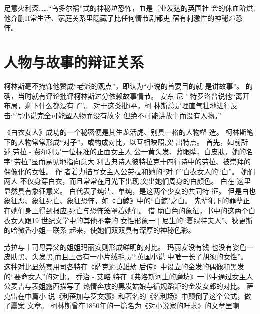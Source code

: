\documentclass[a4paper]{article}
\begin{document}
足意火利深……“乌多尔祸”式的神秘垃恐怖，血是〔业发达的英国社
会的休血阶烘;他介删H常生活、家庭关系里隐藏了比任何情节剧都吏
宿有刺激性的神秘煊恐怖。

\section{人物与故事的辩证关系}

柯林斯亳不掩饰他赞成“老派的观点”，即认为“小说的首要目的就
是讲故事”。 的确，当时就有评论批评柯林斯过分依赖故事情节。 安东
尼 ' 特罗洛普说他“离开布局，剩下什么都没有了”。 对于这类批i平，柯
林斯总是理直气壮地进行反击:“写小说完全可能塑人物而没有故辜
但绝不可能讲故事而没有人物。”

《白衣女人》成功的一个秘密便是其生龙活虎、别具一格的人物塑
造。 柯林斯笔下的人物常常形成“对子”，或构成对比，以互相映照,突
出特点。 首先，如前所述,劳拉 - 费尔利是一位标准的正面女主人
公一黄头发、蓝眼睛、白皮肤，她的名字“劳拉”显而易见地指向意大
利古典诗人彼特拉克十四行诗中的劳拉、被崇拜的偶像化的女性。 作
者着力描写女主人公劳拉和她的“对子”白衣女人的“白”。 她们两人
不仅身穿白衣，而且常常在月光下出现,突出她们周身的白颜色。 白在
这里显然具有象征意义。 白代表了纯洁、单纯，是这两个少女的共同特
征。 但是白也象征恶、象征死亡、象征恐怖，如《白鲸》中的“白鲸"之白。
先辈犯下的罪孽正在她们身上得到报应,死亡与恐怖笼罩着她们。 借
助白色的象征，书中的这两个白衣女人跟19 世纪文学中的其他不幸的
女性形象一ˉ]ˉ尼生的“夏绿特夫人”、狄更斯的哈微香小姐一联系
起来，使她们双双具有深厚的神秘色彩。

劳拉与丨司母异父的姐姐玛丽安则形成鲜明的对比。 玛丽安没有钱
也没有姿色一皮肤黑、头发黑,而且上唇有一小片绒毛,是“英国小说
中唯一长了胡须的女性”。 这种对比显然套用司各特在《萨克逊英雄劫
后传》中设立的金发的偶像和黑发的“要命女人”的对比。 乔治 - 艾略
特在《弗洛斯河上的磨坊》一书中通过女主人公麦吉与表姐露西描写了
热情奔放的黑发姑娘与循规蹈矩的金发女郎的对比。 萨克雷在中篇小
说《利蓓加与罗文娜》和著名的《名利场》中颠倒了这个公式，做了矗案
文章。 柯林斯曾在1850年的一篇名为《对小说家的吁求》的文章里嘲
\end{document}
